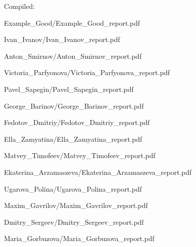 \documentclass[a4paper]{article}
\begin{document}
Compiled: \DTMnow
\tableofcontents

\clearpage

{Example_Good/Example_Good_report.pdf}

{Ivan_Ivanov/Ivan_Ivanov_report.pdf}

{Anton_Smirnov/Anton_Smirnov_report.pdf}

{Victoria_Parfyonova/Victoria_Parfyonova_report.pdf}

{Pavel_Sapegin/Pavel_Sapegin_report.pdf}

{George_Barinov/George_Barinov_report.pdf}

{Fedotov_Dmitriy/Fedotov_Dmitriy_report.pdf}

{Ella_Zamyatina/Ella_Zamyatina_report.pdf}

{Matvey_Timofeev/Matvey_Timofeev_report.pdf}

{Ekaterina_Arzamaszeva/Ekaterina_Arzamaszeva_report.pdf}

{Ugarova_Polina/Ugarova_Polina_report.pdf}


{Maxim_Gavrilov/Maxim_Gavrilov_report.pdf}

{Dmitry_Sergeev/Dmitry_Sergeev_report.pdf}

{Maria_Gorbuzova/Maria_Gorbuzova_report.pdf}
\end{document}
